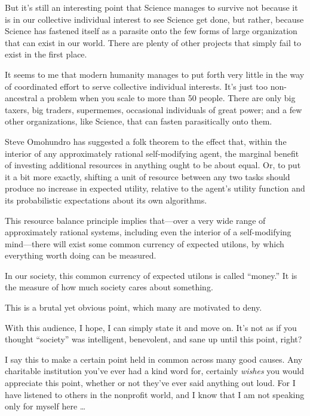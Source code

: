 {
 But it's still an interesting point that Science
manages to survive not because it is in our collective individual
interest to see Science get done, but rather, because Science has
fastened itself as a parasite onto the few forms of large organization
that can exist in our world. There are plenty of other projects that
simply fail to exist in the first place.}

{
 It seems to me that modern humanity manages to put forth very
little in the way of coordinated effort to serve collective individual
interests. It's just too non-ancestral a problem when
you scale to more than 50 people. There are only big taxers, big
traders, supermemes, occasional individuals of great power; and a few
other organizations, like Science, that can fasten parasitically onto
them.}

\myendsectiontext


{
 Steve Omohundro has suggested a folk theorem to the effect that,
within the interior of any approximately rational self-modifying agent,
the marginal benefit of investing additional resources in anything
ought to be about equal. Or, to put it a bit more exactly, shifting a
unit of resource between any two tasks should produce no increase in
expected utility, relative to the agent's utility
function and its probabilistic expectations about its own algorithms. }

{
 This resource balance principle implies that---over a very wide
range of approximately rational systems, including even the interior of
a self-modifying mind---there will exist some common currency of
expected utilons, by which everything worth doing can be measured.}

{
 In our society, this common currency of expected utilons is called
``money.'' It is the measure of how
much society cares about something.}

{
 This is a brutal yet obvious point, which many are motivated to
deny.}

{
 With this audience, I hope, I can simply state it and move on.
It's not as if you thought
``society'' was intelligent,
benevolent, and sane up until this point, right?}

{
 I say this to make a certain point held in common across many good
causes. Any charitable institution you've ever had a
kind word for, certainly \textit{wishes} you would appreciate this
point, whether or not they've ever said anything out
loud. For I have listened to others in the nonprofit world, and I know
that I am not speaking only for myself here \ldots}

